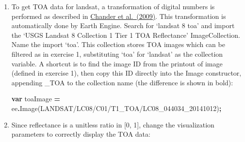 \documentclass[
]{article}
\newenvironment{Shaded}{\begin{snugshade}}{\end{snugshade}}
\newcommand{\FunctionTok}[1]{\textcolor[rgb]{0.00,0.00,0.00}{#1}}
\newcommand{\KeywordTok}[1]{\textcolor[rgb]{0.13,0.29,0.53}{\textbf{#1}}}
\newcommand{\NormalTok}[1]{#1}
\newcommand{\OperatorTok}[1]{\textcolor[rgb]{0.81,0.36,0.00}{\textbf{#1}}}
\newcommand{\StringTok}[1]{\textcolor[rgb]{0.31,0.60,0.02}{#1}}
\begin{document}
\begin{enumerate}
\def\labelenumi{\alph{enumi}.}
\item
  To get TOA data for landsat, a transformation of digital numbers is performed as described in \href{http://www.sciencedirect.com/science/article/pii/S0034425709000169}{Chander et al.~(2009)}. This transformation is automatically done by Earth Engine. Search for `landsat 8 toa' and import the `USGS Landsat 8 Collection 1 Tier 1 TOA Reflectance' ImageCollection. Name the import `toa'. This collection stores TOA images which can be filtered as in exercise 1, substituting `toa' for `landsat' as the collection variable. A shortcut is to find the image ID from the printout of image (defined in exercise 1), then copy this ID directly into the Image constructor, appending \_TOA to the collection name (the difference is shown in bold):

\begin{Shaded}
\begin{Highlighting}[]
\KeywordTok{var}\NormalTok{ toaImage }\OperatorTok{=}\NormalTok{ ee}\OperatorTok{.}\FunctionTok{Image}\NormalTok{(}\StringTok{\textquotesingle{}LANDSAT/LC08/C01/T1\_TOA/LC08\_044034\_20141012\textquotesingle{}}\NormalTok{)}\OperatorTok{;}  
\end{Highlighting}
\end{Shaded}
\item
  Since reflectance is a unitless ratio in {[}0, 1{]}, change the visualization parameters to correctly display the TOA data:


\end{enumerate}
\end{document}
